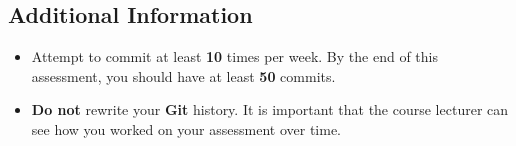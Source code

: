 \documentclass{article}
\begin{document}
\subsection*{Additional Information}
\begin{itemize}
	\item Attempt to commit at least \textbf{10} times per week. By the end of this assessment, you should have at least \textbf{50} commits.
	\item \textbf{Do not} rewrite your \textbf{Git} history. It is important that the course lecturer can see how you worked on your assessment over time.
\end{itemize}
\end{document}

